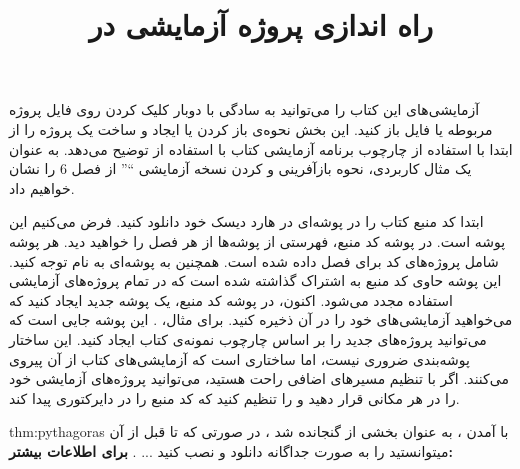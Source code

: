 
\title{
    \huge
    \hspace{-40pt}
    \textbf{راه اندازی پروژه آزمایشی در }
}  \rullFillWithLine[0.5em]{1pt}
\textbf{\vspace{7pt}}

{
    \Large
    \begin{spacing}{1.5}
        آزمایشی‌های این کتاب را می‌توانید به سادگی با دوبار کلیک کردن روی فایل پروژه مربوطه  یا فایل  باز کنید.
        این بخش نحوه‌ی باز کردن یا ایجاد و ساخت یک پروژه را از ابتدا با استفاده از چارچوب برنامه آزمایشی کتاب با استفاده از  توضیح می‌دهد.
        به عنوان یک مثال کاربردی، نحوه بازآفرینی و  کردن نسخه آزمایشی \enquote{} از فصل 6 را نشان خواهیم داد.
    \end{spacing}
}

\textbf{\vspace{-30pt}}
\title{
    \LARGE
}
\textbf{\vspace{-10pt}}

{
    \Large
    \begin{spacing}{1.5}
        ابتدا کد منبع کتاب را در پوشه‌ای در هارد دیسک خود دانلود کنید.
        فرض می‌کنیم این پوشه  است.
        در پوشه کد منبع، فهرستی از پوشه‌ها از هر فصل را خواهید دید. هر پوشه شامل پروژه‌های کد برای فصل داده شده است.
        همچنین به پوشه‌ای به نام  توجه کنید. این پوشه حاوی کد منبع به اشتراک گذاشته شده است که در تمام پروژه‌های آزمایشی استفاده مجدد می‌شود.
        اکنون، در پوشه کد منبع، یک پوشه جدید ایجاد کنید که می‌خواهید آزمایشی‌های خود را در آن ذخیره کنید.
        برای مثال، . این پوشه جایی است که می‌توانید پروژه‌های جدید را بر اساس چارچوب نمونه‌ی کتاب ایجاد کنید.
        این ساختار پوشه‌بندی ضروری نیست، اما ساختاری است که آزمایشی‌های کتاب از آن پیروی می‌کنند. اگر با تنظیم مسیر‌های اضافی راحت هستید، می‌توانید پروژه‌های آزمایشی خود را در هر مکانی قرار دهید و  را تنظیم کنید که کد منبع را در دایرکتوری  پیدا کند.
    \end{spacing}
}

\begin{theo}{thm:pythagoras}
    \Large
    با آمدن ،  به عنوان بخشی از  گنجانده شد ، در صورتی که تا قبل از آن میتوانستید  را به صورت جداگانه دانلود و نصب کنید ... .
    \textbf{برای اطلاعات بیشتر:} \href{https://learn.microsoft.com/en-us/windows/win32/directx-sdk--august-2009-}{}
\end{theo}

